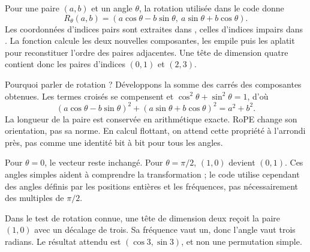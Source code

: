 Pour une paire $(a,b)$ et un angle $\theta$, la rotation utilisée dans le code donne
\[
 R_\theta(a,b)=
 (a\cos\theta-b\sin\theta,\ a\sin\theta+b\cos\theta).
\]
Les coordonnées d'indices pairs sont extraites dans , celles d'indices impairs dans . La fonction calcule les deux nouvelles composantes, les empile puis les aplatit pour reconstituer l'ordre des paires adjacentes. Une tête de dimension quatre contient donc les paires d'indices $(0,1)$ et $(2,3)$.

Pourquoi parler de rotation ? Développons la somme des carrés des composantes obtenues. Les termes croisés se compensent et $\cos^2\theta+\sin^2\theta=1$, d'où
\[
 (a\cos\theta-b\sin\theta)^2+
 (a\sin\theta+b\cos\theta)^2=a^2+b^2.
\]
La longueur de la paire est conservée en arithmétique exacte. RoPE change son orientation, pas sa norme. En calcul flottant, on attend cette propriété à l'arrondi près, pas comme une identité bit à bit pour tous les angles.

Pour $\theta=0$, le vecteur reste inchangé. Pour $\theta=\pi/2$, $(1,0)$ devient $(0,1)$. Ces angles simples aident à comprendre la transformation ; le code utilise cependant des angles définis par les positions entières et les fréquences, pas nécessairement des multiples de $\pi/2$.

Dans le test de rotation connue, une tête de dimension deux reçoit la paire $(1,0)$ avec un décalage de trois. Sa fréquence vaut un, donc l'angle vaut trois radians. Le résultat attendu est $(\cos3,\sin3)$, et non une permutation simple.





